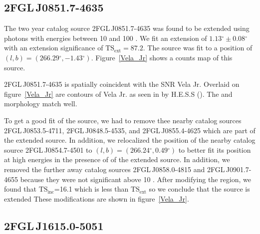 \documentclass[12pt,preprint]{aastex}
\newcommand{\gev}{\text{GeV}\xspace}
\newcommand{\tev}{\text{TeV}\xspace}
\newcommand{\tsext}{{\ensuremath{\text{TS}_\text{ext}}}\xspace}
\newcommand{\tsinc}{\ensuremath{\text{TS}_\text{inc}}\xspace}
\renewcommand{\deg}{\ensuremath{^\circ}\xspace}
\begin{document}
\subsection{2FGL\,J0851.7-4635}
\label{section_2FGL_J0851.7-4635}


The two year catalog source 2FGL\,J0851.7-4635 was found to be
extended using photons with energies between 10 \gev and 100
\gev. We fit an extension of $1.13\deg\pm0.08\deg$ with an extension
significance of $\tsext=87.2$.  The source was fit to a position of
$(l,b)=(266.29\deg,-1.43\deg)$.  Figure~\ref{Vela_Jr} shows a counts
map of this source.

2FGL\,J0851.7-4635 is spatially coincident with the SNR Vela Jr.  Overlaid
on figure~\ref{Vela_Jr} are contours of Vela Jr. as seen in \tev by
H.E.S.S (\cite{vela_jr_hess}).  The \gev and \tev morphology match well.


To get a good fit of the source, we had to remove thee nearby catalog
sources 2FGL\,J0853.5-4711, 2FGL\,J0848.5-4535, and 2FGL\,J0855.4-4625
which are part of the extended source.  In addition, we relocalized
the position of the nearby catalog source 2FGL\,J0854.7-4501 to
$(l,b)=(266.24\deg,0.49\deg)$ to better fit its position at high energies
in the presence of of the extended source.  In addition, we removed the
further away catalog sources 2FGL\,J0858.0-4815 and 2FGL\,J0901.7-4655
because they were not significant above 10 \gev.  After modifying
the region, we found that \tsinc=16.1 which is less than \tsext so we
conclude that the source is extended These modifications are shown in
figure~\ref{Vela_Jr}.


\subsection{2FGL\,J1615.0-5051}
\label{section_2FGL_J1615.0-5051}

\end{document}
